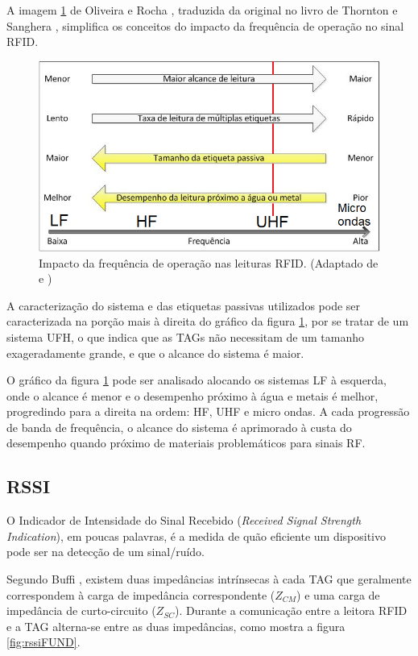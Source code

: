 A imagem \ref{fig:impactoFrec} de Oliveira e Rocha \cite{TG2013OliveiraERocha}, traduzida da original no livro de Thornton e Sanghera \cite{thornton2011cheat}, simplifica os conceitos do impacto da frequência de operação no sinal RFID.

\begin{figure}[H]
    \centering
    \includegraphics[width=0.8\linewidth]{figs/Fundamentos/frequencia.png}
    \caption{Impacto da frequência de operação nas leituras RFID. (Adaptado de \cite{TG2013OliveiraERocha} e \cite{thornton2011cheat})}
    \label{fig:impactoFrec}
\end{figure}

A caracterização do sistema e das etiquetas passivas utilizados pode ser caracterizada na porção mais à direita do gráfico da figura \ref{fig:impactoFrec}, por se tratar de um sistema UFH, o que indica que as TAGs não necessitam de um tamanho exageradamente grande, e que o alcance do sistema é maior.

O gráfico da figura \ref{fig:impactoFrec} pode ser analisado alocando os sistemas LF à esquerda, onde o alcance é menor e o desempenho próximo à água e metais é melhor, progredindo para a direita na ordem: HF, UHF e micro ondas. A cada progressão de banda de frequência, o alcance do sistema é aprimorado à custa do desempenho quando próximo de materiais problemáticos para sinais RF.

\subsection{RSSI}

O Indicador de Intensidade do Sinal Recebido (\textit{Received Signal Strength Indication}), em poucas palavras, é a medida de quão eficiente um dispositivo pode ser na detecção de um sinal/ruído.

Segundo Buffi \cite{buffi2018rssi}, existem duas impedâncias intrínsecas à cada TAG que geralmente correspondem à carga de impedância correspondente ($Z_{CM}$) e uma carga de impedância de curto-circuito ($Z_{SC}$). Durante a comunicação entre a leitora RFID e a TAG alterna-se entre as duas impedâncias, como mostra a figura \ref{fig:rssiFUND}.

